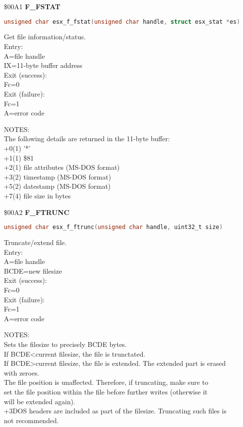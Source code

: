 \$00A1 \textbf{F\_FSTAT}

\begin{lstlisting}[language=C]
unsigned char esx_f_fstat(unsigned char handle, struct esx_stat *es)
\end{lstlisting}

Get file information/status.\\
Entry:\\
A=file handle\\
IX=11-byte buffer address\\
Exit (success):\\
Fc=0\\
Exit (failure):\\
Fc=1\\
A=error code

NOTES:\\
The following details are returned in the 11-byte buffer:\\
+0(1) '*'\\
+1(1) \$81\\
+2(1) file attributes (MS-DOS format)\\
+3(2) timestamp (MS-DOS format)\\
+5(2) datestamp (MS-DOS format)\\
+7(4) file size in bytes

\$00A2 \textbf{F\_FTRUNC}

\begin{lstlisting}[language=C]
unsigned char esx_f_ftrunc(unsigned char handle, uint32_t size)
\end{lstlisting}

Truncate/extend file.\\
Entry:\\
A=file handle\\
BCDE=new filesize\\
Exit (success):\\
Fc=0\\
Exit (failure):\\
Fc=1\\
A=error code

NOTES:\\
Sets the filesize to precisely BCDE bytes.\\
If BCDE<current filesize, the file is trunctated.\\
If BCDE>current filesize, the file is extended. The extended part is erased\\
with zeroes.\\
The file position is unaffected. Therefore, if truncating, make sure to\\
set the file position within the file before further writes (otherwise it\\
will be extended again).\\
+3DOS headers are included as part of the filesize. Truncating such files is\\
not recommended.


